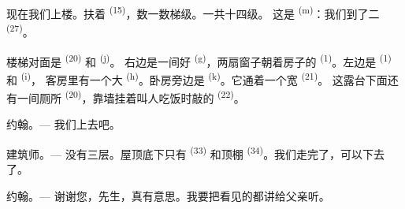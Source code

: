 现在我们上楼。扶着 \textsuperscript{(15)}，数一数梯级。一共十四级。
这是 \textsuperscript{(m)}：我们到了二
\textsuperscript{(27)}。

\VUsaut{3.0mm}
\VUsaut{3.0mm}

楼梯对面是 \textsuperscript{(20)} 和 \textsuperscript{(j)}。
右边是一间好 \textsuperscript{(g)}，两扇窗子朝着房子的
\textsuperscript{(1)}。左边是 \textsuperscript{(1)} 和 \textsuperscript{(i)}，
客房里有一个大 \textsuperscript{(h)}。卧房旁边是
 \textsuperscript{(k)}。它通着一个宽 \textsuperscript{(21)}。
这露台下面还有一间厕所 \textsuperscript{(20)}，靠墙挂着叫人吃饭时敲的
 \textsuperscript{(22)}。

\textsc{约翰}。--- 我们上去吧。

\textsc{建筑师}。--- 没有三层。屋顶底下只有 \textsuperscript{(33)}
和顶棚 \textsuperscript{(34)}。我们走完了，可以下去了。

\textsc{约翰}。--- 谢谢您，先生，真有意思。我要把看见的都讲给父亲听。
\VUsaut{4.0mm}
\VUfilet{22mm}
